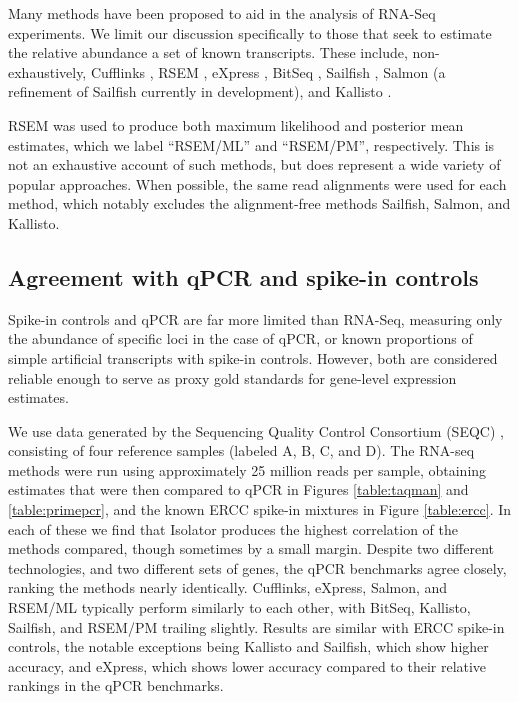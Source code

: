 \documentclass[twocolumn]{article}
\begin{document}
Many methods have been proposed to aid in the analysis of RNA-Seq
experiments. We limit our discussion specifically to those that seek to
estimate the relative abundance a set of known transcripts. These
include, non-exhaustively, Cufflinks \cite{Trapnell:2010kd},
RSEM \cite{Li:2011cb},
eXpress \cite{Roberts:2012dh},
BitSeq \cite{Glaus:2012ek},
Sailfish \cite{Patro:2014jd},
Salmon (a refinement of Sailfish currently in development), and
Kallisto \cite{Bray:2015uj}.

RSEM was used to produce both maximum likelihood and posterior mean estimates,
which we label ``RSEM/ML'' and ``RSEM/PM'', respectively.  This is not an
exhaustive account of such methods, but does represent a wide variety of popular
approaches. When possible, the same read alignments were used for each method,
which notably excludes the alignment-free methods Sailfish, Salmon, and
Kallisto.

\subsection{Agreement with qPCR and spike-in controls}

Spike-in controls and qPCR are far more limited than RNA-Seq, measuring
only the abundance of specific loci in the case of qPCR, or known
proportions of simple artificial transcripts with spike-in controls.
However, both are considered reliable enough to serve as proxy gold
standards for gene-level expression estimates.

We use data generated by the Sequencing Quality Control Consortium (SEQC)
\cite{Consortium:2014kc}, consisting of four reference samples (labeled A, B, C,
and D). The RNA-seq methods were run using approximately 25 million reads per
sample, obtaining estimates that were then compared to qPCR in Figures
\ref{table:taqman} and \ref{table:primepcr}, and the known ERCC spike-in
mixtures in Figure \ref{table:ercc}. In each of these we find that Isolator
produces the highest correlation of the methods compared, though sometimes by a
small margin. Despite two different technologies, and two different sets of
genes, the qPCR benchmarks agree closely, ranking the methods nearly
identically. Cufflinks, eXpress, Salmon, and RSEM/ML typically perform similarly
to each other, with BitSeq, Kallisto, Sailfish, and RSEM/PM trailing slightly.
Results are similar with ERCC spike-in controls, the notable exceptions being
Kallisto and Sailfish, which show higher accuracy, and eXpress, which shows
lower accuracy compared to their relative rankings in the qPCR benchmarks.
\end{document}
